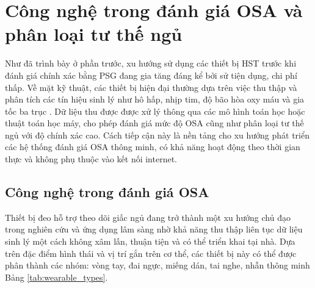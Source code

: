 \section{Công nghệ trong đánh giá OSA và phân loại tư thế ngủ}

Như đã trình bày ở phần trước, xu hướng sử dụng các thiết bị HST trước khi đánh
giá chính xác bằng PSG đang gia tăng đáng kể bởi sử tiện dụng, chi phí thấp. Về
mặt kỹ thuật, các thiết bị hiện đại thường dựa trên việc thu thập và phân tích
các tín hiệu sinh lý như hô hấp, nhịp tim, độ bão hòa oxy máu và gia tốc ba
trục . Dữ liệu thu được được xử lý thông qua các mô hình toán học hoặc thuật
toán học máy, cho phép đánh giá mức độ OSA cũng như phân loại tư thế ngủ với độ
chính xác cao. Cách tiếp cận này là nền tảng cho xu hướng phát triển các hệ
thống đánh giá OSA thông minh, có khả năng hoạt động theo thời gian thực và
không phụ thuộc vào kết nối internet.

\subsection{Công nghệ trong đánh giá OSA}

Thiết bị đeo hỗ trợ theo dõi giấc ngủ đang trở thành một xu hướng chủ đạo trong
nghiên cứu và ứng dụng lâm sàng nhờ khả năng thu thập liên tục dữ liệu sinh lý
một cách không xâm lấn, thuận tiện và có thể triển khai tại nhà. Dựa trên đặc
điểm hình thái và vị trí gắn trên cơ thể, các thiết bị này có thể được phân
thành các nhóm: vòng tay, đai ngực, miếng dán, tai nghe, nhẫn thông minh Bảng
\ref{tab:wearable_types}.


